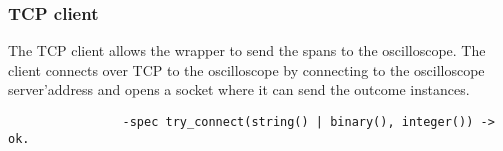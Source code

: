         \subsubsection{TCP client}
            The TCP client allows the wrapper to send the spans to the oscilloscope.
            The client connects over TCP to the oscilloscope by connecting to the oscilloscope server'address and opens a socket where it can send the outcome instances.
            \begin{verbatim}
                -spec try_connect(string() | binary(), integer()) -> ok.
            \end{verbatim}
